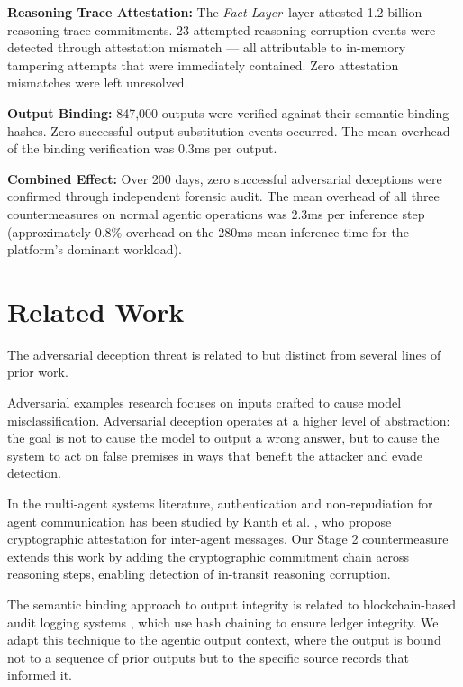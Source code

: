 \documentclass[12pt]{article}
\newcommand{\fact}{\textit{Fact Layer}}
\begin{document}
\textbf{Reasoning Trace Attestation:} The \fact\ layer attested 1.2 billion reasoning trace commitments. 23 attempted reasoning corruption events were detected through attestation mismatch --- all attributable to in-memory tampering attempts that were immediately contained. Zero attestation mismatches were left unresolved.

\textbf{Output Binding:} 847,000 outputs were verified against their semantic binding hashes. Zero successful output substitution events occurred. The mean overhead of the binding verification was 0.3ms per output.

\textbf{Combined Effect:} Over 200 days, zero successful adversarial deceptions were confirmed through independent forensic audit. The mean overhead of all three countermeasures on normal agentic operations was 2.3ms per inference step (approximately 0.8\% overhead on the 280ms mean inference time for the platform's dominant workload).

\section{Related Work}
\label{sec:related}

The adversarial deception threat is related to but distinct from several lines of prior work.

Adversarial examples research \cite{goodfellow2015adv} focuses on inputs crafted to cause model misclassification. Adversarial deception operates at a higher level of abstraction: the goal is not to cause the model to output a wrong answer, but to cause the system to act on false premises in ways that benefit the attacker and evade detection.

In the multi-agent systems literature, authentication and non-repudiation for agent communication has been studied by Kanth et al. \cite{kanth2012}, who propose cryptographic attestation for inter-agent messages. Our Stage 2 countermeasure extends this work by adding the cryptographic commitment chain across reasoning steps, enabling detection of in-transit reasoning corruption.

The semantic binding approach to output integrity is related to blockchain-based audit logging systems \cite{nakamoto2008bitcoin}, which use hash chaining to ensure ledger integrity. We adapt this technique to the agentic output context, where the output is bound not to a sequence of prior outputs but to the specific source records that informed it.
\end{document}
